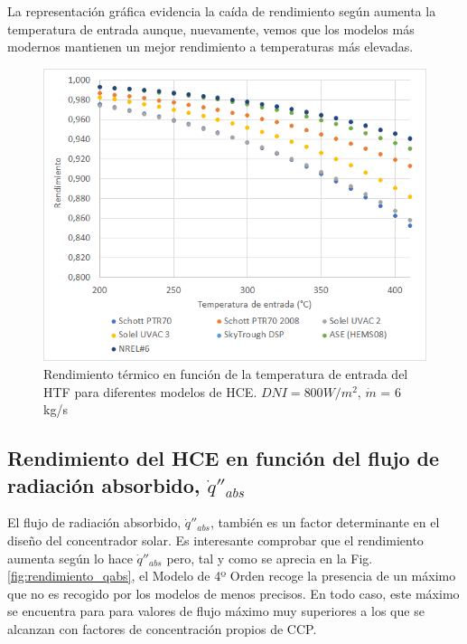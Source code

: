 La representación gráfica evidencia la caída de rendimiento según aumenta la temperatura de entrada aunque, nuevamente, vemos que los modelos más modernos mantienen un mejor rendimiento a temperaturas más elevadas.

\begin{figure}[H]
\includegraphics[width=0.9\linewidth]{images/rendimiento_temperatura.png}
\caption[Rendimiento térmico en función de la temperatura de entrada del HTF para diferentes modelos de HCE]{Rendimiento térmico en función de la temperatura de entrada del HTF para diferentes modelos de HCE. $DNI= 800 W/m^2$, $\dot m$ = 6 kg/s} 
\label{fig:test2a}
\end{figure}


\subsection{Rendimiento del HCE en función del flujo de radiación absorbido, $\dot q''_{abs}$}

El flujo de radiación absorbido, $\dot q''_{abs}$,  también es un factor determinante en el diseño del concentrador solar. Es interesante comprobar que el rendimiento aumenta según lo hace $\dot q''_{abs}$ pero, tal y como se aprecia en la Fig. \ref{fig:rendimiento_qabs}, el Modelo de 4º Orden recoge la presencia de un máximo que no es recogido por los modelos de menos precisos.  En todo caso, este máximo se encuentra para para valores de flujo máximo muy superiores a los que se alcanzan con factores de concentración propios de CCP.

